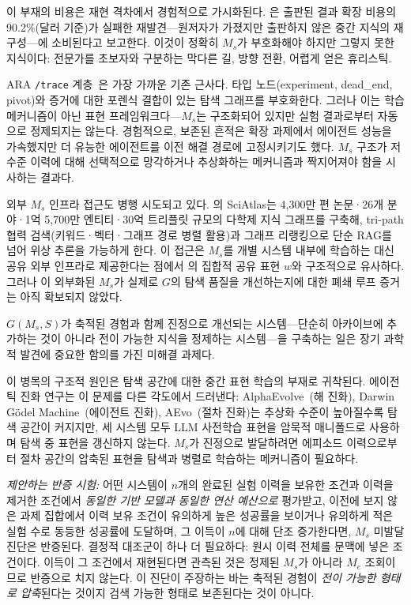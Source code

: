 \documentclass[11pt]{article}
\begin{document}
이 부재의 비용은 재현 격차에서 경험적으로 가시화된다. \citet{liu2026lasthuman}은 출판된 결과 확장 비용의 90.2\%(달러 기준)가 실패한 재발견---원저자가 가졌지만 출판하지 않은 중간 지식의 재구성---에 소비된다고 보고한다. 이것이 정확히 $M_s$가 부호화해야 하지만 그렇지 못한 지식이다: 전문가를 초보자와 구분하는 막다른 길, 방향 전환, 어렵게 얻은 휴리스틱.

ARA \texttt{/trace} 계층~\citep{liu2026lasthuman}은 가장 가까운 기존 근사다. 타입 노드(experiment, dead\_end, pivot)와 증거에 대한 포렌식 결합이 있는 탐색 그래프를 부호화한다. 그러나 이는 학습 메커니즘이 아닌 표현 프레임워크다---$M_s$는 구조화되어 있지만 실험 결과로부터 자동으로 정제되지는 않는다. 경험적으로, 보존된 흔적은 확장 과제에서 에이전트 성능을 가속했지만 더 유능한 에이전트를 이전 해결 경로에 고정시키기도 했다. $M_s$ 구조가 저수준 이력에 대해 선택적으로 망각하거나 추상화하는 메커니즘과 짝지어져야 함을 시사하는 결과다.

외부 $M_s$ 인프라 접근도 병행 시도되고 있다. \citet{qiao2026sciatlas}의 SciAtlas는 4,300만 편 논문·26개 분야·1억 5,700만 엔티티·30억 트리플릿 규모의 다학제 지식 그래프를 구축해, tri-path 협력 검색(키워드·벡터·그래프 경로 병렬 활용)과 그래프 리랭킹으로 단순 RAG를 넘어 위상 추론을 가능하게 한다. 이 접근은 $M_s$를 개별 시스템 내부에 학습하는 대신 공유 외부 인프라로 제공한다는 점에서 \citet{taniguchi2024cpc}의 집합적 공유 표현 $w$와 구조적으로 유사하다. 그러나 이 외부화된 $M_s$가 실제로 $G$의 탐색 품질을 개선하는지에 대한 폐쇄 루프 증거는 아직 확보되지 않았다.

$G(M_s, S)$가 축적된 경험과 함께 진정으로 개선되는 시스템---단순히 아카이브에 추가하는 것이 아니라 전이 가능한 지식을 정제하는 시스템---을 구축하는 일은 장기 과학적 발견에 중요한 함의를 가진 미해결 과제다.

이 병목의 구조적 원인은 탐색 공간에 대한 중간 표현 학습의 부재로 귀착된다. 에이전틱 진화 연구는 이 문제를 다른 각도에서 드러낸다: AlphaEvolve~\citep{georgiev2025alphaevolve}(해 진화), Darwin G\"{o}del Machine~\citep{zhang2025dgm}(에이전트 진화), AEvo~\citep{aevo2026}(절차 진화)는 추상화 수준이 높아질수록 탐색 공간이 커지지만, 세 시스템 모두 LLM 사전학습 표현을 암묵적 매니폴드로 사용하며 탐색 중 표현을 갱신하지 않는다. $M_s$가 진정으로 발달하려면 에피소드 이력으로부터 절차 공간의 압축된 표현을 탐색과 병렬로 학습하는 메커니즘이 필요하다.


\textit{제안하는 반증 시험:} 어떤 시스템이 $n$개의 완료된 실험 이력을 보유한 조건과 이력을
제거한 조건에서 \emph{동일한 기반 모델과 동일한 연산 예산으로} 평가받고, 이전에 보지 않은
과제 집합에서 이력 보유 조건이 유의하게 높은 성공률을 보이거나 유의하게 적은 실험 수로 동등한
성공률에 도달하며, 그 이득이 $n$에 대해 단조 증가한다면, $M_s$ 미발달 진단은 반증된다.
결정적 대조군이 하나 더 필요하다: 원시 이력 전체를 문맥에 넣은 조건이다. 이득이 그 조건에서
재현된다면 관측된 것은 정제된 $M_s$가 아니라 $M_e$ 조회이므로 반증으로 치지 않는다. 이
진단이 주장하는 바는 축적된 경험이 \emph{전이 가능한 형태로 압축}된다는 것이지 검색 가능한
형태로 보존된다는 것이 아니다.
\end{document}

